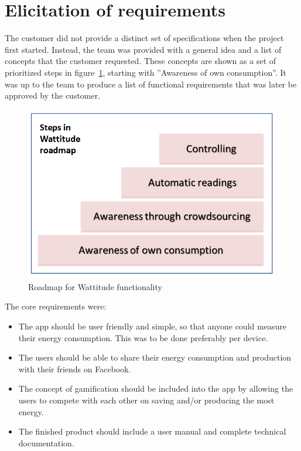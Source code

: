 \section{Elicitation of requirements}
\label{sec:obtainingreq}

The customer did not provide a distinct set of specifications when the project first started. Instead, the team was provided with a general idea and a list of concepts that the customer requested. These concepts are shown as a set of prioritized steps in figure~\ref{fig:roadmap}, starting with ''Awareness of own consumption''. It was up to the team to produce a list of functional requirements that was later be approved by the customer.

\begin{figure}[H]
\centering
\includegraphics[height=0.37\textheight]{ch/specification/fig/roadmap.png}
\caption{Roadmap for Wattitude functionality}
\label{fig:roadmap}
\end{figure}

The core requirements were:
\begin{itemize}
\item The app should be user friendly and simple, so that anyone could measure their energy consumption. This was to be done preferably per device. 
\item The users should be able to share their energy consumption and production with their friends on Facebook. 
\item The concept of \gls{gamification} should be included into the app by allowing the users to compete with each other on saving and/or producing the most energy. 
\item The finished product should include a user manual and complete technical documentation.
\end{itemize}

